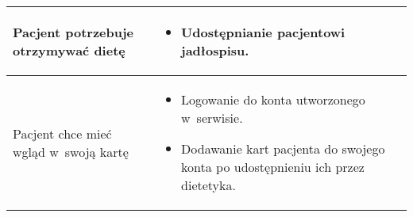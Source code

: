 \begin{minipage}{\textwidth}
\begin{table}[H]
\begin{tabular}{|P{.3\textwidth}|P{.6\textwidth}|}
            \hline
            Pacjent potrzebuje otrzymywać dietę &
            \begin{itemize}
                \item Udostępnianie pacjentowi jadłospisu.
            \end{itemize} \\
            \hline
            Pacjent chce mieć wgląd w~swoją kartę &
            \begin{itemize}
                \item Logowanie do konta utworzonego w~serwisie.
                \item Dodawanie kart pacjenta do swojego konta po udostępnieniu ich przez dietetyka.
            \end{itemize} \\
            \hline
        \end{tabular}
    \end{table}
\end{minipage}



